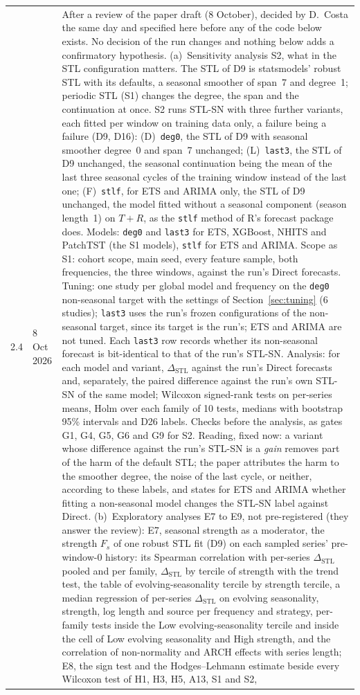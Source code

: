 \documentclass[11pt,a4paper]{article}
\newcommand{\code}[1]{\texttt{#1}}
\newcommand{\dstl}{\Delta_{\mathrm{STL}}}
\begin{document}
\begin{longtable}{@{}p{1.3cm} p{1.9cm} p{11.8cm}@{}}
2.4 & 8 Oct 2026 & After a review of the paper draft (8 October), decided by D.\ Costa the same day and specified here before any of the code below exists. No decision of the run changes and nothing below adds a confirmatory hypothesis. (a)~Sensitivity analysis S2, what in the STL configuration matters. The STL of D9 is statsmodels' robust STL with its defaults, a seasonal smoother of span~7 and degree~1; periodic STL (S1) changes the degree, the span and the continuation at once. S2 runs STL-SN with three further variants, each fitted per window on training data only, a failure being a failure (D9, D16): (D)~\code{deg0}, the STL of D9 with seasonal smoother degree~0 and span~7 unchanged; (L)~\code{last3}, the STL of D9 unchanged, the seasonal continuation being the mean of the last three seasonal cycles of the training window instead of the last one; (F)~\code{stlf}, for ETS and ARIMA only, the STL of D9 unchanged, the model fitted without a seasonal component (season length~1) on $T+R$, as the \code{stlf} method of R's forecast package does. Models: \code{deg0} and \code{last3} for ETS, XGBoost, NHITS and PatchTST (the S1 models), \code{stlf} for ETS and ARIMA. Scope as S1: cohort scope, main seed, every feature sample, both frequencies, the three windows, against the run's Direct forecasts. Tuning: one study per global model and frequency on the \code{deg0} non-seasonal target with the settings of Section~\ref{sec:tuning} (6 studies); \code{last3} uses the run's frozen configurations of the non-seasonal target, since its target is the run's; ETS and ARIMA are not tuned. Each \code{last3} row records whether its non-seasonal forecast is bit-identical to that of the run's STL-SN. Analysis: for each model and variant, $\dstl$ against the run's Direct forecasts and, separately, the paired difference against the run's own STL-SN of the same model; Wilcoxon signed-rank tests on per-series means, Holm over each family of 10 tests, medians with bootstrap 95\% intervals and D26 labels. Checks before the analysis, as gates G1, G4, G5, G6 and G9 for S2. Reading, fixed now: a variant whose difference against the run's STL-SN is a \emph{gain} removes part of the harm of the default STL; the paper attributes the harm to the smoother degree, the noise of the last cycle, or neither, according to these labels, and states for ETS and ARIMA whether fitting a non-seasonal model changes the STL-SN label against Direct. (b)~Exploratory analyses E7 to E9, not pre-registered (they answer the review): E7, seasonal strength as a moderator, the strength $F_s$ of one robust STL fit (D9) on each sampled series' pre-window-0 history: its Spearman correlation with per-series $\dstl$ pooled and per family, $\dstl$ by tercile of strength with the trend test, the table of evolving-seasonality tercile by strength tercile, a median regression of per-series $\dstl$ on evolving seasonality, strength, log length and source per frequency and strategy, per-family tests inside the Low evolving-seasonality tercile and inside the cell of Low evolving seasonality and High strength, and the correlation of non-normality and ARCH effects with series length; E8, the sign test and the Hodges--Lehmann estimate beside every Wilcoxon test of H1, H3, H5, A13, S1 and S2, 
\end{longtable}
\end{document}
